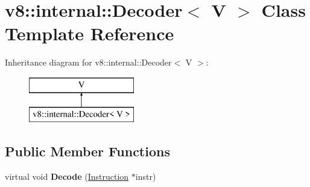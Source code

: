\hypertarget{classv8_1_1internal_1_1_decoder}{}\section{v8\+:\+:internal\+:\+:Decoder$<$ V $>$ Class Template Reference}
\label{classv8_1_1internal_1_1_decoder}
Inheritance diagram for v8\+:\+:internal\+:\+:Decoder$<$ V $>$\+:\begin{figure}[H]
\begin{center}
\leavevmode
\includegraphics[height=2.000000cm]{classv8_1_1internal_1_1_decoder}
\end{center}
\end{figure}
\subsection*{Public Member Functions}
\begin{DoxyCompactItemize}
\item 
virtual void {\bfseries Decode} (\hyperlink{classv8_1_1internal_1_1_instruction}{Instruction} $\ast$instr)\hypertarget{classv8_1_1internal_1_1_decoder_a8981c25a9530bdbe6b44f21c96a7be22}{}\label{classv8_1_1internal_1_1_decoder_a8981c25a9530bdbe6b44f21c96a7be22}

\end{DoxyCompactItemize}
